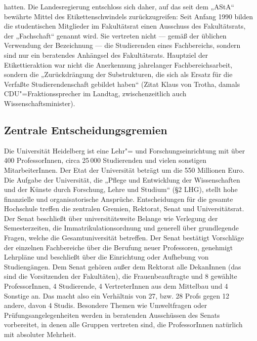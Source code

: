 hatten. Die Landesregierung entschloss sich daher, auf das seit dem „AStA“
bewährte Mittel des Etikettenschwindels zurückzugreifen: Seit Anfang 1990
bilden die studentischen Mitglieder im Fakultätsrat einen Ausschuss des
Fakultätsrats, der „Fachschaft“ genannt wird. Sie vertreten nicht — gemäß
der üblichen Verwendung der Bezeichnung — die Studierenden eines
Fachbereichs, sondern sind nur ein beratendes Anhängsel des Fakultätsrats.
Hauptziel der Etikettieraktion war nicht die Anerkennung jahrelanger
Fachbereichsarbeit, sondern die „Zurückdrängung der Substrukturen, die
sich als Ersatz für die Verfaßte Studierendenschaft gebildet haben“ (Zitat
Klaus von Trotha, damals CDU"=Fraktionssprecher im Landtag,
zwischenzeitlich auch Wissenschaftsminister).


\subsection{Zentrale Entscheidungsgremien}
Die Universität Heidelberg ist eine Lehr"= und Forschungseinrichtung mit
über 400 ProfessorInnen, circa 25\,000 Studierenden und vielen sonstigen
MitarbeiterInnen. Der Etat der Universität beträgt um die 550 Millionen
Euro. Die Aufgabe der Universität, die „Pflege und Entwicklung der
Wissenschaften und der Künste durch Forschung, Lehre und Studium“ (§2
LHG), stellt hohe finanzielle und organisatorische Ansprüche.
Entscheidungen für die gesamte Hochschule treffen die zentralen Gremien,
Rektorat, Senat und Universitätsrat. Der Senat beschließt über
universitätsweite Belange wie Verlegung der Semesterzeiten, die
Immatrikulationsordnung und generell über grundlegende Fragen, welche die
Gesamtuniversität betreffen. Der Senat bestätigt Vorschläge der einzelnen
Fachbereiche über die Berufung neuer Professoren, genehmigt Lehrpläne und
beschließt über die Einrichtung oder Aufhebung von Studiengängen. Dem
Senat gehören außer dem Rektorat alle DekanInnen (das sind die
Vorsitzenden der Fakultäten), die Frauenbeauftragte und 8 gewählte
ProfessorInnen, 4 Studierende, 4 VertreterInnen aus dem Mittelbau und 4
Sonstige an. Das macht also ein Verhältnis von 27, bzw. 28 Profs gegen 12
andere, davon 4 Studis. Besondere Themen wie Umweltfragen oder
Prüfungsangelegenheiten werden in beratenden Ausschüssen des Senats
vorbereitet, in denen alle Gruppen vertreten sind, die ProfessorInnen
natürlich mit absoluter Mehrheit.

